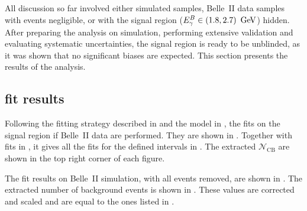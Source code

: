 All discussion so far involved either simulated samples, Belle~II data samples with \BtoXsgamma events negligible,
or with the signal region (${E^B_{\gamma}}\in(1.8,2.7)~\mathrm{\,Ge\kern -0.1em V}$) hidden.
After preparing the analysis on simulation, performing extensive validation and evaluating systematic uncertainties, 
the signal region is ready to be unblinded, as it was shown that no significant biases are expected.
This section presents the results of the analysis.

\subsection{\texorpdfstring{\Mbc}{Mbc} fit results}\label{sec:mbc_fit_results}

Following the \Mbc fitting strategy described in  and the model in ,
the fits on the signal region if Belle~II data are performed.
They are shown in .
Together with fits in , it gives all the fits for the defined \EB intervals in .
The extracted $\mathcal{N}_{\mathrm{CB}}$ are shown in the top right corner of each figure.

The fit results on Belle~II simulation, with all \BtoXsgamma events removed, are shown in .
The extracted number of \BB background events is shown in .
These values are corrected and scaled and are equal to the ones listed in .

